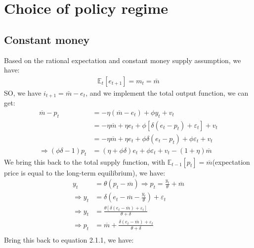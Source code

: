 \documentclass[a4paper,12pt]{article} %
\theoremstyle{nonitalic}
\begin{document}
\section{Choice of policy regime}

\subsection{Constant money}

Based on the rational expectation and constant money supply assumption, we have:
\begin{gather*}
    \mathbb{E}_t[e_{t+1}] = m_t = \bar{m}
\end{gather*}
SO, we have $i_{t+1} = \bar{m} - e_t$, and we implement the total output function, we can get:
\begin{align*}
    \overline{m} - p_t &= -\eta (\overline{m} - e_t) + \phi y_t + v_t \\
                       &= -\eta \overline{m} + \eta e_t + \phi \left[\delta (e_t - p_t) + \varepsilon_t\right] + v_t \\
                       &= -\eta \overline{m} + \eta e_t + \phi \delta (e_t - p_t) + \phi \varepsilon_t + v_t \\
    \Rightarrow  (\phi \delta - 1)p_t &= (\eta + \phi \delta )e_t + \phi \varepsilon_t + v_t - (1 + \eta)\overline{m} \tag{2.1.1}
\end{align*}
We bring this back to the total supply function, with $\mathbb{E}_{t-1}[p_t] = \overline{m}$(expectation price is equal to the long-term equilibrium),
we have:
\begin{align*}
    y_t &= \theta (p_t - \overline{m}) \Rightarrow p_t = \frac{y_t}{\theta} + \overline{m} \\
    \Rightarrow y_t &= \delta \left( e_t - \overline{m} - \frac{y_t}{\theta} \right) + \varepsilon_t \\
    \Rightarrow y_t &= \frac{\theta\left[\delta (e_t - \overline{m}) + \varepsilon_t \right]}{\theta + \delta} \\
    \Rightarrow p_t &= \overline{m} + \frac{\delta (e_t - \overline{m}) + \varepsilon_t}{\theta + \delta}  \\
\end{align*}
Bring this back to equation 2.1.1, we have:
\end{document}
